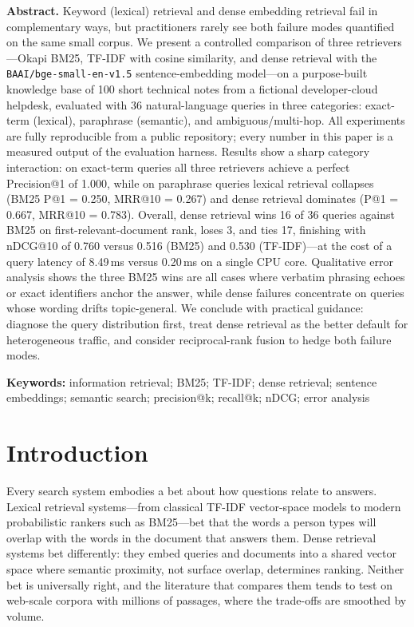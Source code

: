 \documentclass[11pt,a4paper]{article}
\newcommand{\code}[1]{\texttt{#1}}
\begin{document}
\begin{center}
\begin{minipage}{0.92\columnwidth}
\small
\textbf{Abstract.} Keyword (lexical) retrieval and dense embedding retrieval fail in complementary ways, but practitioners rarely see both failure modes quantified on the same small corpus. We present a controlled comparison of three retrievers---Okapi BM25, TF-IDF with cosine similarity, and dense retrieval with the \code{BAAI/bge-small-en-v1.5} sentence-embedding model---on a purpose-built knowledge base of 100 short technical notes from a fictional developer-cloud helpdesk, evaluated with 36 natural-language queries in three categories: exact-term (lexical), paraphrase (semantic), and ambiguous/multi-hop. All experiments are fully reproducible from a public repository; every number in this paper is a measured output of the evaluation harness. Results show a sharp category interaction: on exact-term queries all three retrievers achieve a perfect Precision@1 of 1.000, while on paraphrase queries lexical retrieval collapses (BM25 P@1 = 0.250, MRR@10 = 0.267) and dense retrieval dominates (P@1 = 0.667, MRR@10 = 0.783). Overall, dense retrieval wins 16 of 36 queries against BM25 on first-relevant-document rank, loses 3, and ties 17, finishing with nDCG@10 of 0.760 versus 0.516 (BM25) and 0.530 (TF-IDF)---at the cost of a query latency of 8.49\,ms versus 0.20\,ms on a single CPU core. Qualitative error analysis shows the three BM25 wins are all cases where verbatim phrasing echoes or exact identifiers anchor the answer, while dense failures concentrate on queries whose wording drifts topic-general. We conclude with practical guidance: diagnose the query distribution first, treat dense retrieval as the better default for heterogeneous traffic, and consider reciprocal-rank fusion to hedge both failure modes.

\vspace{4pt}
\textbf{Keywords:} information retrieval; BM25; TF-IDF; dense retrieval; sentence embeddings; semantic search; precision@k; recall@k; nDCG; error analysis
\end{minipage}
\end{center}
\vspace{4pt}

\section{Introduction}\label{sec:intro}

Every search system embodies a bet about how questions relate to answers. Lexical retrieval systems---from classical TF-IDF vector-space models to modern probabilistic rankers such as BM25---bet that the words a person types will overlap with the words in the document that answers them. Dense retrieval systems bet differently: they embed queries and documents into a shared vector space where semantic proximity, not surface overlap, determines ranking. Neither bet is universally right, and the literature that compares them tends to test on web-scale corpora with millions of passages, where the trade-offs are smoothed by volume.
\end{document}
